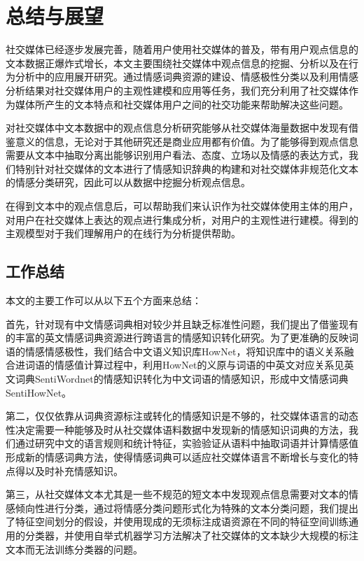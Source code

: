 \chapter{总结与展望}
\label{con}
社交媒体已经逐步发展完善，随着用户使用社交媒体的普及，带有用户观点信息的文本数据正爆炸式增长，本文主要围绕社交媒体中观点信息的挖掘、分析以及在行为分析中的应用展开研究。通过情感词典资源的建设、情感极性分类以及利用情感分析结果对社交媒体用户的主观性建模和应用等任务，我们充分利用了社交媒体作为媒体所产生的文本特点和社交媒体用户之间的社交功能来帮助解决这些问题。

对社交媒体中文本数据中的观点信息分析研究能够从社交媒体海量数据中发现有借鉴意义的信息，无论对于其他研究还是商业应用都有价值。为了能够得到观点信息需要从文本中抽取分离出能够识别用户看法、态度、立场以及情感的表达方式，我们特别针对社交媒体的文本进行了情感知识辞典的构建和对社交媒体非规范化文本的情感分类研究，因此可以从数据中挖掘分析观点信息。

在得到文本中的观点信息后，可以帮助我们来认识作为社交媒体使用主体的用户，对用户在社交媒体上表达的观点进行集成分析，对用户的主观性进行建模。得到的主观模型对于我们理解用户的在线行为分析提供帮助。

\section{工作总结}

本文的主要工作可以从以下五个方面来总结：

首先，针对现有中文情感词典相对较少并且缺乏标准性问题，我们提出了借鉴现有的丰富的英文情感词典资源进行跨语言的情感知识转化研究。为了更准确的反映词语的情感情感极性，我们结合中文语义知识库HowNet，将知识库中的语义关系融合进词语的情感值计算过程中，利用HowNet的义原与词语的中英文对应关系见英文词典SentiWordnet的情感知识转化为中文词语的情感知识，形成中文情感词典SentiHowNet。

第二，仅仅依靠从词典资源标注或转化的情感知识是不够的，社交媒体语言的动态性决定需要一种能够及时从社交媒体语料数据中发现新的情感知识词典的方法，我们通过研究中文的语言规则和统计特征，实验验证从语料中抽取词语并计算情感值形成新的情感词典方法，使得情感词典可以适应社交媒体语言不断增长与变化的特点得以及时补充情感知识。

第三，从社交媒体文本尤其是一些不规范的短文本中发现观点信息需要对文本的情感倾向性进行分类，通过将情感分类问题形式化为特殊的文本分类问题，我们提出了特征空间划分的假设，并使用现成的无须标注成语资源在不同的特征空间训练通用的分类器，并使用自举式机器学习方法解决了社交媒体的文本缺少大规模的标注文本而无法训练分类器的问题。

